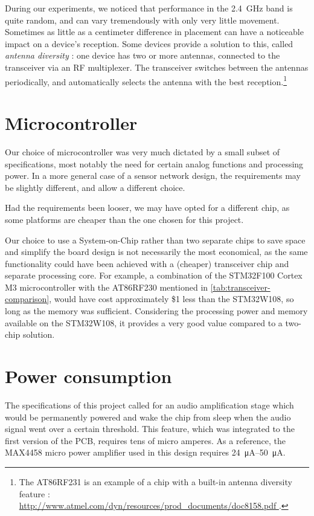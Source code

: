 During our experiments, we noticed that performance in the \SI{2.4}{GHz} band is
quite random, and can vary tremendously with only very little movement.
Sometimes as little as a centimeter difference in placement can have
a noticeable impact on a device's reception. Some devices provide a solution to
this, called \emph{antenna diversity} : one device has two or more antennas,
connected to the transceiver via an RF multiplexer. The transceiver switches
between the antennas periodically, and automatically selects the antenna with
the best reception.\footnote{The AT86RF231 is an example of a chip with
a built-in antenna diversity feature : \url{
http://www.atmel.com/dyn/resources/prod_documents/doc8158.pdf }.}

\section{Microcontroller}

Our choice of microcontroller was very much dictated by a small subset of
specifications, most notably the need for certain analog functions and
processing power. In a more general case of a sensor network design, the
requirements may be slightly different, and allow a different choice.

Had the requirements been looser, we may have opted for a different chip, as
some platforms are cheaper than the one chosen for this project.

Our choice to use a System-on-Chip rather than two separate chips to save space
and simplify the board design is not necessarily the most economical, as the
same functionality could have been achieved with a (cheaper) transceiver chip
and separate processing core. For example, a combination of the STM32F100 Cortex
M3 microcontroller with the AT86RF230 mentioned in
\autoref{tab:transceiver-comparison}, would have cost approximately \$1 less
than the STM32W108, so long as the memory was sufficient. Considering the
processing power and memory available on the STM32W108, it provides a very good
value compared to a two-chip solution.

\section{Power consumption}

The specifications of this project called for an audio amplification stage which
would be permanently powered and wake the chip from sleep when the audio signal
went over a certain threshold. This feature, which was integrated to the first
version of the PCB, requires tens of micro amperes. As a reference, the MAX4458
micro power amplifier used in this design requires
\SIrange{24}{50}{\micro\ampere}.

